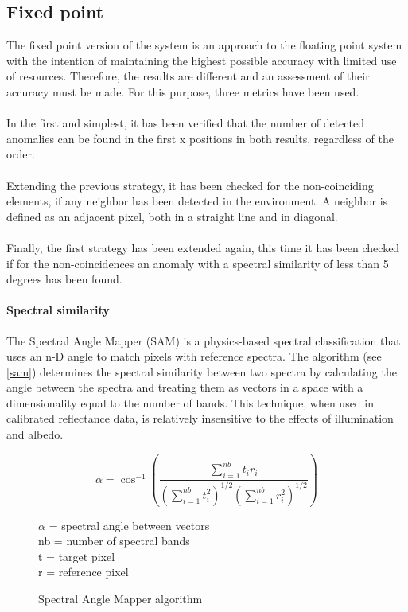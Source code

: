 \subsection{Fixed point}
The fixed point version of the system is an approach to the floating point system with the intention of maintaining the highest possible accuracy with limited use of resources.
Therefore, the results are different and an assessment of their accuracy must be made. For this purpose, three metrics have been used.
\\
\\
In the first and simplest, it has been verified that the number of detected anomalies can be found in the first x positions in both results, regardless of the order.
\\
\\
Extending the previous strategy, it has been checked for the non-coinciding elements, if any neighbor has been detected in the environment. A neighbor is defined as an adjacent pixel, both in a straight line and in diagonal.
\\
\\
Finally, the first strategy has been extended again, this time it has been checked if for the non-coincidences an anomaly with a spectral similarity of less than 5 degrees has been found.
\paragraph{Spectral similarity}
The Spectral Angle Mapper (SAM) is a physics-based spectral classification that uses an n-D angle to match pixels with reference spectra. The algorithm (see \autoref{sam}) determines the spectral similarity between two spectra by calculating the angle between the spectra and treating them as vectors in a space with a dimensionality equal to the number of bands. This technique, when used in calibrated reflectance data, is relatively insensitive to the effects of illumination and albedo.
\pagebreak
\begin{figure}[h!]
\begin{minipage}[t]{0.5\linewidth}
\centering
\[\alpha = \cos^{-1}\left ( \frac{\sum\limits^{nb}_{i=1}{t_{i}r_{i}}}{\left ( \sum\limits^{nb}_{i=1}{t_{i}^2} \right )^{1/2}\left ( \sum\limits^{nb}_{i=1}{r_{i}^2} \right )^{1/2}} \right )\]
\label{sam}
\end{minipage}
\begin{minipage}[t]{0.05\linewidth}
\end{minipage}
\begin{minipage}[t]{0.45\linewidth}
\vspace{0.7cm}
$\alpha$ = spectral angle between vectors
\\
nb = number of spectral bands
\\
t = target pixel
\\
r = reference pixel
\end{minipage}
\caption{Spectral Angle Mapper algorithm}
\end{figure}
\\
\\
